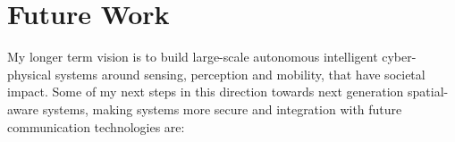 \documentclass[10pt]{article}
\begin{document}



\section{Future Work}
My longer term vision is to build large-scale autonomous intelligent cyber-physical systems around sensing, perception and mobility, that have societal impact. Some of my next steps in this direction towards next generation spatial-aware systems, making systems more secure and integration with future communication technologies are: %

\end{document}
